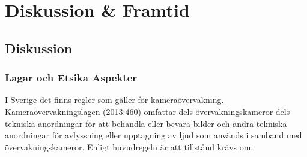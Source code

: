 
\chapter{Diskussion \& Framtid} %
\label{ch:diskussion}


\ifpdf
    \graphicspath{{7/figures/PNG/}{7/figures/PDF/}{7/figures/}}
\else
    \graphicspath{{7/figures/EPS/}{7/figures/}}
\fi





\section{Diskussion}
\subsection{Lagar och Etsika Aspekter}
I Sverige det finns regler som gäller för kameraövervakning. Kameraövervakningslagen (2013:460) omfattar dels övervakningskameror dels tekniska anordningar för att behandla eller bevara bilder och andra tekniska anordningar för avlyssning eller upptagning av ljud som används i samband med övervakningskameror. 
Enligt huvudregeln är att tillstånd krävs om:


